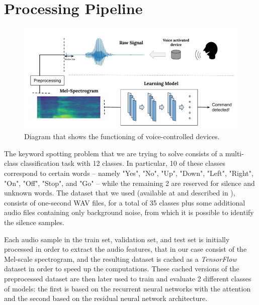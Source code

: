 

\section{Processing Pipeline}
\label{sec:processing_architecture}

\begin{figure}[htbp]
\centerline{\includegraphics[scale=.35]{processing_pipeline.pdf}}
\caption{Diagram that shows the functioning of voice-controlled devices.}
\label{fig}
\end{figure}
 

The keyword spotting problem that we are trying to solve consists of a multi-class classification task with 12 classes. In particular, 10 of these classes correspond to certain words -- namely "Yes", "No", "Up", "Down", "Left", "Right", "On", "Off", "Stop", and "Go" -- while the remaining 2 are reserved for silence and unknown words.
The dataset that we used (available at \cite{5} and described in \cite{4}), consists of one-second WAV files, for a total of 35 classes plus some additional audio files containing only background noise, from which it is possible to identify the silence samples.


Each audio sample in the train set, validation set, and test set is initially processed in order to extract the audio features, that in our case consist of the Mel-scale spectrogram, and the resulting dataset is cached as a \textit{TensorFlow} dataset in order to speed up the computations.
These cached versions of the preprocessed dataset are then later used to train and evaluate 2 different classes of models: the first is based on the recurrent neural networks with the attention and the second based on the residual neural network architecture.


